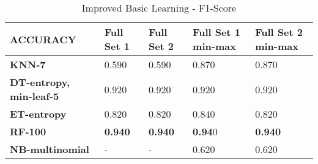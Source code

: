 \documentclass[10pt, conference, compsocconf]{IEEEtran}
\begin{document}
\begin{center}
	\begin{table}[t]
		\centering \footnotesize
		\vspace{0.01cm}
		\caption{Improved Basic Learning - F1-Score}
		\hspace{1cm}
		\begin{tabularx}{\linewidth}{ l  X  X  X  X }
			\hline
			\textbf{ACCURACY} &	\textbf{Full Set 1}&	\textbf{Full Set 2}&	\textbf{Full Set 1 min-max}&	\textbf{Full Set 2 min-max} \\ \hline
			
			
			\textbf{KNN-7}&  0.590&	0.590&	0.870&	0.870 \\ \hline
			\textbf{DT-entropy, min-leaf-5}&  0.920	&0.920&	0.920&	0.920	 \\ \hline
			\textbf{ET-entropy}&  0.820&	0.820&	0.840&	0.820	\\ \hline
			\textbf{RF-100}& \textbf{0.940}&	\textbf{0.940}&	\textbf{0.94}0&	\textbf{0.940}	 \\ \hline
			\textbf{NB-multinomial}&  -&	-&	0.620&	0.620 \\ \hline
			
			
		\end{tabularx}\newline
		\vspace{-0.05cm}
		\label{Table4}
	\end{table} \hfil
\end{center}
\end{document}
